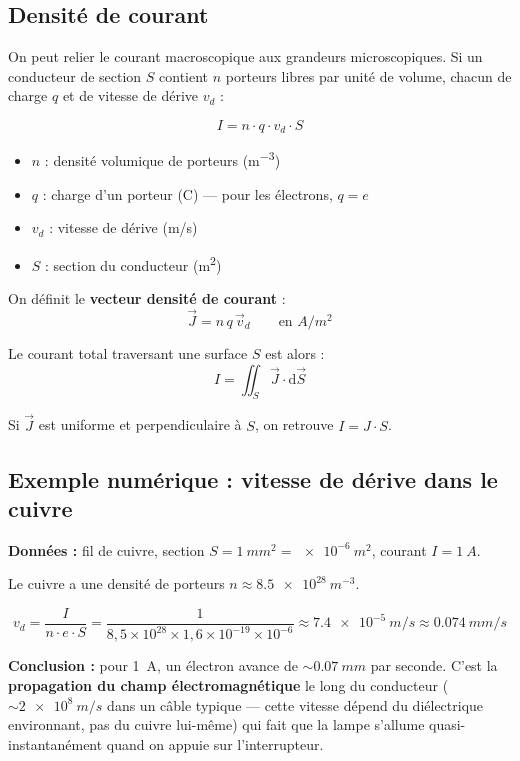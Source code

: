 \documentclass[12pt,a4paper,twoside]{book}
\begin{document}
\subsection{Densité de courant}

On peut relier le courant macroscopique aux grandeurs microscopiques. Si un conducteur de section $S$ contient $n$ porteurs libres par unité de volume, chacun de charge $q$ et de vitesse de dérive $v_d$ :

\begin{formule}
\[
\boxed{I = n \cdot q \cdot v_d \cdot S}
\]
\begin{itemize}[nosep]
\item $n$ : densité volumique de porteurs (\si{m^{-3}})
\item $q$ : charge d'un porteur (\si{C}) — pour les électrons, $q = e$
\item $v_d$ : vitesse de dérive (\si{m/s})
\item $S$ : section du conducteur (\si{m^2})
\end{itemize}
\end{formule}

On définit le \textbf{vecteur densité de courant} :
\[
\vec{J} = n \, q \, \vec{v}_d \qquad \text{en } \si{A/m^2}
\]

Le courant total traversant une surface $S$ est alors :
\[
I = \iint_S \vec{J} \cdot \mathrm{d}\vec{S}
\]

Si $\vec{J}$ est uniforme et perpendiculaire à $S$, on retrouve $I = J \cdot S$.

\subsection{Exemple numérique : vitesse de dérive dans le cuivre}

\begin{pratique}
\textbf{Données :} fil de cuivre, section $S = \SI{1}{mm^2} = \SI{e-6}{m^2}$, courant $I = \SI{1}{A}$.

Le cuivre a une densité de porteurs $n \approx \SI{8.5e28}{m^{-3}}$.

\[
v_d = \frac{I}{n \cdot e \cdot S} = \frac{1}{8{,}5 \times 10^{28} \times 1{,}6 \times 10^{-19} \times 10^{-6}} \approx \SI{7.4e-5}{m/s} \approx \SI{0.074}{mm/s}
\]

\textbf{Conclusion :} pour \SI{1}{A}, un électron avance de $\sim \SI{0.07}{mm}$ par seconde. C'est la \textbf{propagation du champ électromagnétique} le long du conducteur ($\sim \SI{2e8}{m/s}$ dans un câble typique — cette vitesse dépend du diélectrique environnant, pas du cuivre lui-même) qui fait que la lampe s'allume quasi-instantanément quand on appuie sur l'interrupteur.
\end{pratique}
\end{document}
